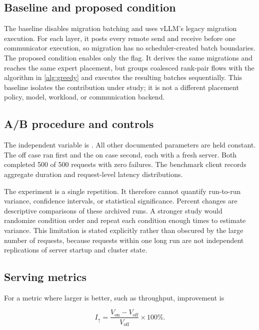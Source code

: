 \subsection{Baseline and proposed condition}

The baseline disables migration batching and uses vLLM's legacy migration
execution. For each layer, it posts every remote send and receive before one
communicator execution, so migration has no scheduler-created batch boundaries.
The proposed condition enables only the
 flag. It derives the same migrations and
reaches the same expert placement, but groups coalesced rank-pair flows with the
algorithm in \cref{alg:greedy} and executes the resulting batches sequentially.
This baseline isolates the contribution under study; it is not a different
placement policy, model, workload, or communication backend.

\subsection{A/B procedure and controls}

The independent variable is
. All other documented parameters are held
constant. The off case ran first and the on case second, each with a fresh
server. Both completed 500 of 500 requests with zero failures. The benchmark
client records aggregate duration and request-level latency distributions.

The experiment is a single repetition. It therefore cannot quantify run-to-run
variance, confidence intervals, or statistical significance. Percent changes
are descriptive comparisons of these archived runs. A stronger study would
randomize condition order and repeat each condition enough times to estimate
variance. This limitation is stated explicitly rather than obscured by the
large number of requests, because requests within one long run are not
independent replications of server startup and cluster state.

\subsection{Serving metrics}

For a metric where larger is better, such as throughput, improvement is

\begin{equation}
  I_{\uparrow}=\frac{V_{\mathrm{on}}-V_{\mathrm{off}}}
  {V_{\mathrm{off}}}\times100\%.
\end{equation}

